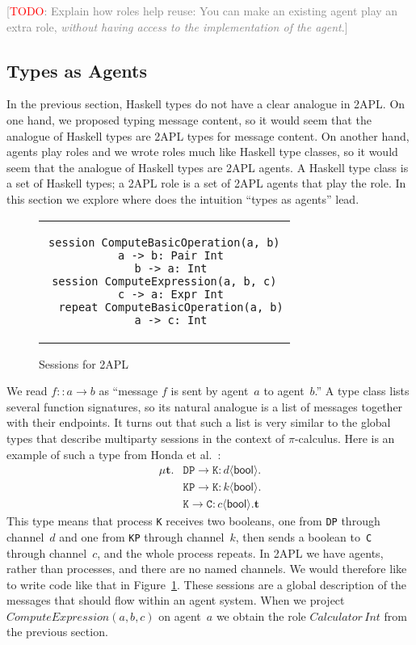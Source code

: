 \documentclass[conference,compsoc]{IEEEtran} %
\newcommand{\todo}[1]{{\small \textcolor{gray}{[\textcolor{red}{TODO}: #1]}}}
\begin{document}
\todo{Explain how roles help reuse: You can make an existing agent play an
extra role, \emph{without having access to the implementation of the
agent}.}

\subsection{Types as Agents} %

In the previous section, Haskell types do not have a clear analogue in
2APL. On one hand, we proposed typing message content, so it would seem
that the analogue of Haskell types are 2APL types for message content. On
another hand, agents play roles and we wrote roles much like Haskell type
classes, so it would seem that the analogue of Haskell types are 2APL
agents. A Haskell type class is a set of Haskell types; a 2APL role is a
set of 2APL agents that play the role. In this section we explore where
does the intuition ``types as agents'' lead.

\begin{figure}\footnotesize %
\begin{center}
\begin{tabular}{c}
\begin{lstlisting}[style=me]
session ComputeBasicOperation(a, b)
  a -> b: Pair Int
  b -> a: Int
session ComputeExpression(a, b, c)
  c -> a: Expr Int
  repeat ComputeBasicOperation(a, b)
  a -> c: Int
\end{lstlisting}
\end{tabular}
\end{center}
\caption{Sessions for 2APL}\label{fig:sessions}
\end{figure} %

{\def\l#1->#2:#3<#4>{\mathtt{#1}\to\mathtt{#2}:#3\langle\mathsf{#4}\rangle}
We read $f::a\to b$ as ``message $f$ is sent by agent~$a$ to agent~$b$.'' A
type class lists several function signatures, so its natural analogue is a
list of messages together with their endpoints. It turns out that such a
list is very similar to the global types that describe multiparty sessions
in the context of $\pi$-calculus. Here is an example of such a type from
Honda et al.~\cite{dblp:conf/popl/hondayc08}:
\begin{align*}
\mu\mathbf{t}. 
  &\l DP->K:d<bool>. \\
  &\l KP->K:k<bool>. \\
  &\l K->C:c<bool>.\mathbf{t}
\end{align*}
This type means that process \texttt{K} receives two booleans, one from
\texttt{DP} through channel~$d$ and one from \texttt{KP} through
channel~$k$, then sends a boolean to~\texttt{C} through channel~$c$, and
the whole process repeats. In 2APL we have agents, rather than processes,
and there are no named channels. We would therefore like to write code like
that in Figure~\ref{fig:sessions}.  These sessions are a global description
of the messages that should flow within an agent system. When we project
$\mathit{ComputeExpression}(a,b,c)$ on agent~$a$ we obtain the role
$\mathit{Calculator}\,\mathit{Int}$ from the previous section.}
\end{document}
